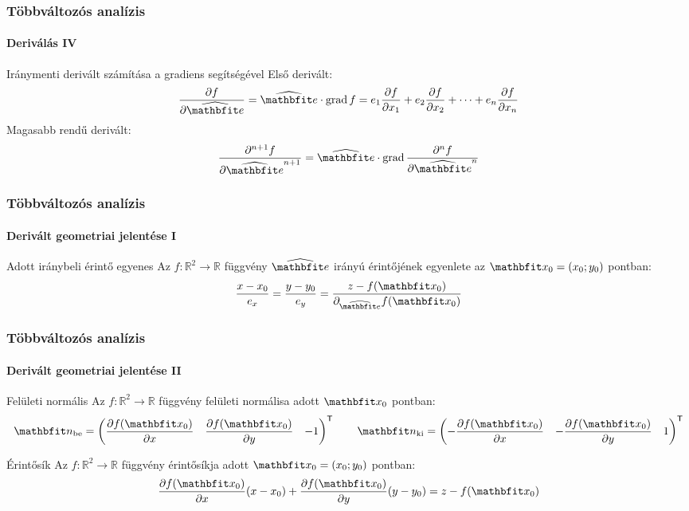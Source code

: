 \begin{frame}
  \frametitle{Többváltozós analízis}
  \framesubtitle{Deriválás IV}

  \begin{block}{Iránymenti derivált számítása a gradiens segítségével}
    Első derivált:
    \[
      \pdv{f}{\uvec e}
      = \uvec e \cdot \grad f
      = e_1 \pdv{f}{x_1} + e_2 \pdv{f}{x_2} + \dots + e_n \pdv{f}{x_n}
    \]
    Magasabb rendű derivált:
    \[
      \pdv[order={n+1}]{f}{\uvec e}
      = \uvec e \cdot \grad \pdv[order={n}]{f}{\uvec e}
    \]
  \end{block}
\end{frame}

\begin{frame}
  \frametitle{Többváltozós analízis}
  \framesubtitle{Derivált geometriai jelentése I}

  \begin{block}{Adott iránybeli érintő egyenes}
    Az $f: \mathbb R^2 \rightarrow \mathbb R$ függvény $\uvec e$ irányú
    érintőjének egyenlete az $\rvec x_0 = (x_0; y_0)$ pontban:
    \[
      \frac{x - x_0}{e_x} =
      \frac{y - y_0}{e_y} =
      \frac{z - f(\rvec x_0)}{\partial_{\uvec e} f(\rvec x_0)}
    \]
  \end{block}
\end{frame}

\begin{frame}
  \frametitle{Többváltozós analízis}
  \framesubtitle{Derivált geometriai jelentése II}

  \begin{block}{Felületi normális}
    \newcommand\ds{\displaystyle}
    Az $f: \mathbb R^2 \rightarrow \mathbb R$ függvény felületi normálisa
    adott $\rvec x_0$ pontban:
    \[
      \rvec n_\text{be} = \begin{pmatrix}
        \ds\pdv{f(\rvec x_0)}{x} & \ds\pdv{f(\rvec x_0)}{y} & -1
      \end{pmatrix}^{\mathsf T}
      \qquad
      \rvec n_\text{ki} = \begin{pmatrix}
        -\ds\pdv{f(\rvec x_0)}{x} & -\ds\pdv{f(\rvec x_0)}{y} & 1
      \end{pmatrix}^{\mathsf T}
    \]
  \end{block}

  \begin{block}{Érintősík}
    Az $f: \mathbb R^2 \rightarrow \mathbb R$ függvény érintősíkja
    adott $\rvec x_0 = (x_0; y_0)$ pontban:
    \[
      \pdv{f(\rvec x_0)}{x} (x - x_0) +
      \pdv{f(\rvec x_0)}{y} (y - y_0) =
      z - f(\rvec x_0)
    \]
  \end{block}
\end{frame}

